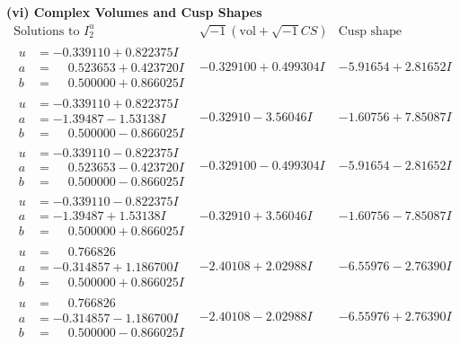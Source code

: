 \documentclass[1p]{elsarticle_modified}
\theoremstyle{definition}
\newcommand{\I}{\sqrt{-1}}
\begin{document}
\newpage\flushleft \textbf{(vi) Complex Volumes and Cusp Shapes}
$$\begin{array}{c|c|c}  
\text{Solutions to }I^u_{2}& \I (\text{vol} + \sqrt{-1}CS) & \text{Cusp shape}\\
 \hline 
\begin{aligned}
u &= -0.339110 + 0.822375 I \\
a &= \phantom{-}0.523653 + 0.423720 I \\
b &= \phantom{-}0.500000 + 0.866025 I\end{aligned}
 & -0.329100 + 0.499304 I & -5.91654 + 2.81652 I \\ \hline\begin{aligned}
u &= -0.339110 + 0.822375 I \\
a &= -1.39487 - 1.53138 I \\
b &= \phantom{-}0.500000 - 0.866025 I\end{aligned}
 & -0.32910 - 3.56046 I & -1.60756 + 7.85087 I \\ \hline\begin{aligned}
u &= -0.339110 - 0.822375 I \\
a &= \phantom{-}0.523653 - 0.423720 I \\
b &= \phantom{-}0.500000 - 0.866025 I\end{aligned}
 & -0.329100 - 0.499304 I & -5.91654 - 2.81652 I \\ \hline\begin{aligned}
u &= -0.339110 - 0.822375 I \\
a &= -1.39487 + 1.53138 I \\
b &= \phantom{-}0.500000 + 0.866025 I\end{aligned}
 & -0.32910 + 3.56046 I & -1.60756 - 7.85087 I \\ \hline\begin{aligned}
u &= \phantom{-}0.766826\phantom{ +0.000000I} \\
a &= -0.314857 + 1.186700 I \\
b &= \phantom{-}0.500000 + 0.866025 I\end{aligned}
 & -2.40108 + 2.02988 I & -6.55976 - 2.76390 I \\ \hline\begin{aligned}
u &= \phantom{-}0.766826\phantom{ +0.000000I} \\
a &= -0.314857 - 1.186700 I \\
b &= \phantom{-}0.500000 - 0.866025 I\end{aligned}
 & -2.40108 - 2.02988 I & -6.55976 + 2.76390 I \\ \hline\begin{aligned}

\end{aligned}
\end{array}$$
\end{document}
